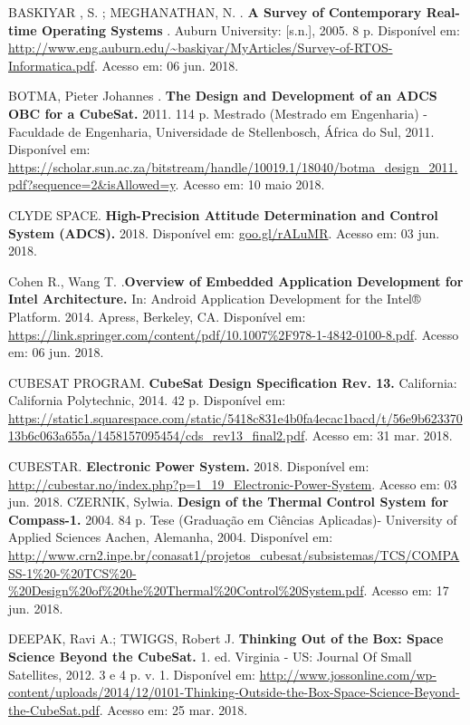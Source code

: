 \noindent BASKIYAR , S. ; MEGHANATHAN, N. . \textbf{A Survey of Contemporary Real-time Operating Systems} . Auburn University: [s.n.], 2005. 8 p. Disponível em: \url{http://www.eng.auburn.edu/~baskiyar/MyArticles/Survey-of-RTOS-Informatica.pdf}. Acesso em: 06 jun. 2018.

\noindent BOTMA, Pieter Johannes . \textbf{The Design and Development of an ADCS OBC for a CubeSat. } 2011. 114 p. Mestrado (Mestrado em Engenharia) - Faculdade de Engenharia, Universidade de Stellenbosch, África do Sul, 2011. Disponível em: \url{https://scholar.sun.ac.za/bitstream/handle/10019.1/18040/botma_design_2011.pdf?sequence=2&isAllowed=y}. Acesso em: 10 maio 2018.

\noindent CLYDE SPACE. \textbf{High-Precision Attitude Determination and Control System (ADCS). } 2018. Disponível em: \url{goo.gl/rALuMR}. Acesso em: 03 jun. 2018.

\noindent Cohen R., Wang T. .\textbf{Overview of Embedded Application Development for Intel Architecture.} In: Android Application Development for the Intel® Platform. 2014. Apress, Berkeley, CA. Disponível em: \url{https://link.springer.com/content/pdf/10.1007\%2F978-1-4842-0100-8.pdf}. Acesso em: 06 jun. 2018.

\noindent CUBESAT PROGRAM. \textbf{CubeSat Design Specification Rev. 13. } California: California Polytechnic, 2014. 42 p. Disponível em: \url{https://static1.squarespace.com/static/5418c831e4b0fa4ecac1bacd/t/56e9b62337013b6c063a655a/1458157095454/cds_rev13_final2.pdf}. Acesso em: 31 mar. 2018.

\noindent CUBESTAR. \textbf{Electronic Power System. } 2018. Disponível em: \url{http://cubestar.no/index.php?p=1_19_Electronic-Power-System}. Acesso em: 03 jun. 2018.
\noindent CZERNIK, Sylwia. \textbf{Design of the Thermal Control System for Compass-1. } 2004. 84 p. Tese (Graduação em Ciências Aplicadas)- University of Applied Sciences Aachen, Alemanha, 2004. Disponível em: \url{http://www.crn2.inpe.br/conasat1/projetos_cubesat/subsistemas/TCS/COMPASS-1\%20-\%20TCS\%20-\%20Design\%20of\%20the\%20Thermal\%20Control\%20System.pdf}. Acesso em: 17 jun. 2018.

\noindent DEEPAK, Ravi A.; TWIGGS, Robert J. \textbf{Thinking Out of the Box: Space Science Beyond the CubeSat. } 1. ed. Virginia - US: Journal Of Small Satellites, 2012. 3 e 4 p. v. 1. Disponível em: \url{http://www.jossonline.com/wp-content/uploads/2014/12/0101-Thinking-Outside-the-Box-Space-Science-Beyond-the-CubeSat.pdf}. Acesso em: 25 mar. 2018.

